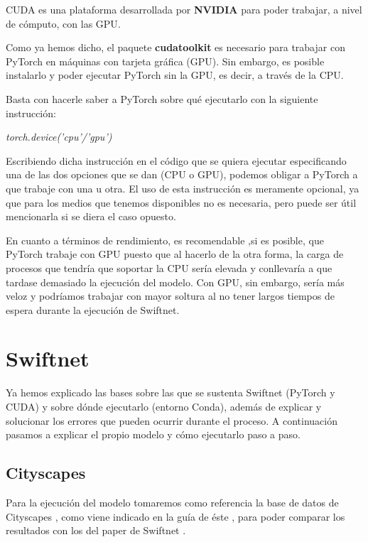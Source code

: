 CUDA \cite{cuda} es una plataforma desarrollada por \textbf{NVIDIA} para poder trabajar, a nivel de cómputo, con las \ac{GPU}.

Como ya hemos dicho, el paquete \textbf{cudatoolkit} es necesario para trabajar con PyTorch en máquinas con tarjeta gráfica (\ac{GPU}). Sin embargo, es posible instalarlo y poder ejecutar PyTorch sin la \ac{GPU}, es decir, a través de la \ac{CPU}.

Basta con hacerle saber a PyTorch sobre qué ejecutarlo con la siguiente instrucción:

\begin{center}
\textit{torch.device('cpu'/'gpu')}
\end{center}

Escribiendo dicha instrucción en el código que se quiera ejecutar especificando una de las dos opciones que se dan (\ac{CPU} o \ac{GPU}), podemos obligar a PyTorch a que trabaje con una u otra. El uso de esta instrucción es meramente opcional, ya que para los medios que tenemos disponibles no es necesaria, pero puede ser útil mencionarla si se diera el caso opuesto.

En cuanto a términos de rendimiento, es recomendable ,si es posible, que PyTorch trabaje con \ac{GPU} puesto que al hacerlo de la otra forma, la carga de procesos que tendría que soportar la \ac{CPU} sería elevada y conllevaría a que tardase demasiado la ejecución del modelo. Con \ac{GPU}, sin embargo, sería más veloz y podríamos trabajar con mayor soltura al no tener largos tiempos de espera durante la ejecución de Swiftnet.


\section{Swiftnet}

Ya hemos explicado las bases sobre las que se sustenta Swiftnet (PyTorch y CUDA) y sobre dónde ejecutarlo (entorno Conda), además de explicar y solucionar los errores que pueden ocurrir durante el proceso. A continuación pasamos a explicar el propio modelo y cómo ejecutarlo paso a paso.

\subsection{Cityscapes}

Para la ejecución del modelo tomaremos como referencia la base de datos de Cityscapes \cite{cityscapes}, como viene indicado en la guía de éste \cite{github_swiftnet}, para poder comparar los resultados con los del paper de Swiftnet \cite{swiftnet}.

